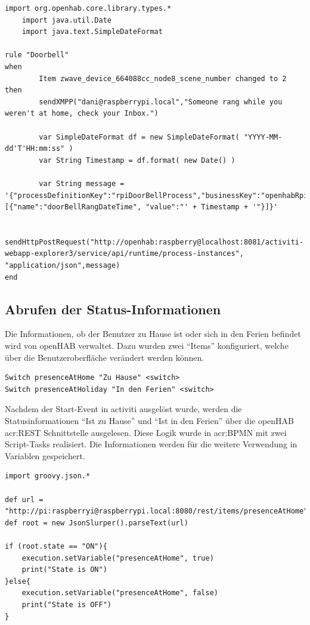 \begin{lstlisting}[caption=Die definierte "`Doorbell"' Regel.]
    import org.openhab.core.library.types.*
    import java.util.Date
    import java.text.SimpleDateFormat

rule "Doorbell"
when
        Item zwave_device_664088cc_node8_scene_number changed to 2
then
        sendXMPP("dani@raspberrypi.local","Someone rang while you weren't at home, check your Inbox.")

        var SimpleDateFormat df = new SimpleDateFormat( "YYYY-MM-dd'T'HH:mm:ss" )
        var String Timestamp = df.format( new Date() )

        var String message = '{"processDefinitionKey":"rpiDoorBellProcess","businessKey":"openhabRpi","variables": [{"name":"doorBellRangDateTime", "value":"' + Timestamp + '"}]}'

        sendHttpPostRequest("http://openhab:raspberry@localhost:8081/activiti-webapp-explorer3/service/api/runtime/process-instances", "application/json",message)
end

\end{lstlisting}

\subsection{Abrufen der Status-Informationen}
Die Informationen, ob der Benutzer zu Hause ist oder sich in den Ferien befindet wird von openHAB verwaltet. Dazu wurden zwei "`Items"' konfiguriert, welche über die Benutzeroberfläche verändert werden können.

\begin{lstlisting}[caption={Item-Definitionen für die An-, bzw. Abwesenheitsinformationen.}]
Switch presenceAtHome "Zu Hause" <switch>
Switch presenceAtHoliday "In den Ferien" <switch>
\end{lstlisting}

Nachdem der Start-Event in activiti ausgelöst wurde, werden die Statusinformationen "`Ist zu Hause"' und "`Ist in den Ferien"' über die openHAB \gls{acr:REST} Schnittstelle ausgelesen. Diese Logik wurde in \gls{acr:BPMN} mit zwei Script-Tasks realisiert. Die Informationen werden für die weitere Verwendung in Variablen gespeichert.

\begin{lstlisting}[caption={Grovvy Script zum Auslesen der Information "`Ist zu Hause"'.}]
import groovy.json.*
 
def url = "http://pi:raspberryi@raspberrypi.local:8080/rest/items/presenceAtHome".toURL().text
def root = new JsonSlurper().parseText(url)
 
if (root.state == "ON"){
	execution.setVariable("presenceAtHome", true)
	print("State is ON")
}else{
	execution.setVariable("presenceAtHome", false)
	print("State is OFF")
}
\end{lstlisting}

